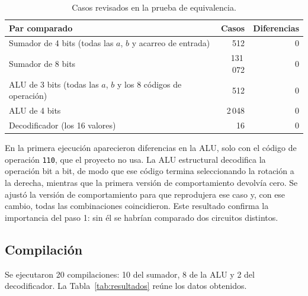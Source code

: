 \documentclass[11pt,letterpaper]{article}
\begin{document}
\begin{table}[H]
\centering
\caption{Casos revisados en la prueba de equivalencia.}
\label{tab:equiv}
\begin{tabular}{lrr}
\toprule
Par comparado & Casos & Diferencias \\
\midrule
Sumador de 4 bits (todas las $a$, $b$ y acarreo de entrada) & 512 & 0 \\
Sumador de 8 bits & 131\,072 & 0 \\
ALU de 3 bits (todas las $a$, $b$ y los 8 códigos de operación) & 512 & 0 \\
ALU de 4 bits & 2\,048 & 0 \\
Decodificador (los 16 valores) & 16 & 0 \\
\bottomrule
\end{tabular}
\end{table}

En la primera ejecución aparecieron diferencias en la ALU, solo con el código de operación
\texttt{110}, que el proyecto no usa. La ALU estructural decodifica la operación bit a bit, de
modo que ese código termina seleccionando la rotación a la derecha, mientras que la primera
versión de comportamiento devolvía cero. Se ajustó la versión de comportamiento para que
reprodujera ese caso y, con ese cambio, todas las combinaciones coincidieron. Este resultado
confirma la importancia del paso 1: sin él se habrían comparado dos circuitos distintos.

\subsection{Compilación}

Se ejecutaron 20 compilaciones: 10 del sumador, 8 de la ALU y 2 del decodificador. La
Tabla~\ref{tab:resultados} reúne los datos obtenidos.
\end{document}
